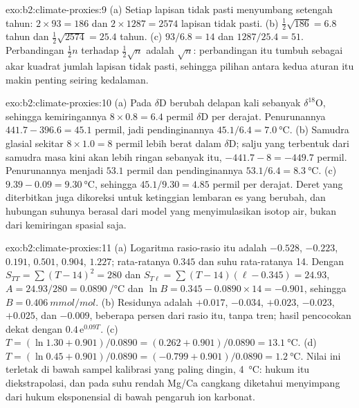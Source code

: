 \begin{solution}{exo:b2:climate-proxies:9}
(a) Setiap lapisan tidak pasti menyumbang setengah tahun: $2 \times 93 = 186$ dan $2 \times 1287 = 2574$
lapisan tidak pasti. (b) $\frac12\sqrt{186} = 6.8$ tahun dan $\frac12\sqrt{2574} = 25.4$ tahun.
(c) $93/6.8 = 14$ dan $1287/25.4 = 51$. Perbandingan $\frac12 n$ terhadap $\frac12\sqrt{n}$ adalah
$\sqrt{n}$: perbandingan itu tumbuh sebagai akar kuadrat jumlah lapisan tidak pasti, sehingga pilihan antara
kedua aturan itu makin penting seiring kedalaman.
\end{solution}

\begin{solution}{exo:b2:climate-proxies:10}
(a) Pada  $\delta$D berubah delapan kali sebanyak $\delta^{18}$O, sehingga
kemiringannya $8 \times 0.8 = 6.4$ permil $\delta$D per derajat. Penurunannya $441.7 - 396.6 = 45.1$
permil, jadi pendinginannya $45.1/6.4 = \qty{7.0}{\celsius}$. (b) Samudra glasial sekitar
$8 \times 1.0 = 8$ permil lebih berat dalam $\delta$D; salju yang terbentuk dari samudra masa kini akan
lebih ringan sebanyak itu, $-441.7 - 8 = -449.7$ permil. Penurunannya menjadi $53.1$ permil dan pendinginannya
$53.1/6.4 = \qty{8.3}{\celsius}$. (c) $9.39 - 0.09 = \qty{9.30}{\celsius}$, sehingga $45.1/9.30 = 4.85$
permil per derajat. Deret yang diterbitkan juga dikoreksi untuk ketinggian lembaran es yang
berubah, dan hubungan suhunya berasal dari model yang menyimulasikan isotop air, bukan dari
kemiringan spasial saja.
\end{solution}

\begin{solution}{exo:b2:climate-proxies:11}
(a) Logaritma rasio-rasio itu adalah $-0.528$, $-0.223$, $0.191$, $0.501$, $0.904$, $1.227$;
rata-ratanya $0.345$ dan suhu rata-ratanya 14. Dengan $S_{TT} = \sum (T - 14)^2 = 280$ dan $S_{T\ell} =
\sum (T - 14)(\ell - 0.345) = 24.93$, $A = 24.93/280 = \qty{0.0890}{\per\celsius}$ dan $\ln B =
0.345 - 0.0890 \times 14 = -0.901$, sehingga $B = \qty{0.406}{mmol/mol}$. (b) Residunya adalah
$+0.017$, $-0.034$, $+0.023$, $-0.023$, $+0.025$, dan $-0.009$, beberapa persen dari rasio itu, tanpa
tren; hasil pencocokan dekat dengan $0.4\,\mathrm{e}^{0.09T}$. (c) $T = (\ln 1.30 + 0.901)/0.0890 = (0.262 +
0.901)/0.0890 = \qty{13.1}{\celsius}$. (d) $T = (\ln 0.45 + 0.901)/0.0890 = (-0.799 +
0.901)/0.0890 = \qty{1.2}{\celsius}$. Nilai ini terletak di bawah sampel kalibrasi yang paling dingin,
\qty{4}{\celsius}: hukum itu diekstrapolasi, dan pada suhu rendah Mg/Ca cangkang diketahui
menyimpang dari hukum eksponensial di bawah pengaruh ion karbonat.
\end{solution}

